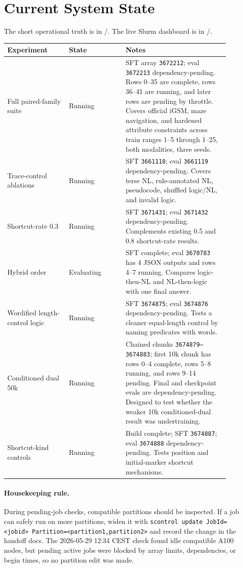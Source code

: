 \section{Current System State}

The short operational truth is in \repo{}/.
The live Slurm dashboard is in \repo{}/.

\begin{longtable}{p{0.25\linewidth}p{0.23\linewidth}p{0.42\linewidth}}
\toprule
Experiment & State & Notes \\
\midrule
Full paired-family suite & Running & SFT array \texttt{3672212}; eval \texttt{3672213} dependency-pending. Rows 0--35 are complete, rows 36--41 are running, and later rows are pending by throttle. Covers official iGSM, maze navigation, and hardened attribute constraints across train ranges 1--5 through 1--25, both modalities, three seeds. \\
Trace-control ablations & Running & SFT \texttt{3661118}; eval \texttt{3661119} dependency-pending. Covers terse NL, rule-annotated NL, pseudocode, shuffled logic/NL, and invalid logic. \\
Shortcut-rate 0.3 & Running & SFT \texttt{3671431}; eval \texttt{3671432} dependency-pending. Complements existing 0.5 and 0.8 shortcut-rate results. \\
Hybrid order & Evaluating & SFT complete; eval \texttt{3670783} has 4 JSON outputs and rows 4--7 running. Compares logic-then-NL and NL-then-logic with one final answer. \\
Wordified length-control logic & Running & SFT \texttt{3674875}; eval \texttt{3674876} dependency-pending. Tests a cleaner equal-length control by naming predicates with words. \\
Conditioned dual 50k & Running & Chained chunks \texttt{3674879--3674883}; first 10k chunk has rows 0--4 complete, rows 5--8 running, and rows 9--14 pending. Final and checkpoint evals are dependency-pending. Designed to test whether the weaker 10k conditioned-dual result was undertraining. \\
Shortcut-kind controls & Running & Build complete; SFT \texttt{3674887}; eval \texttt{3674888} dependency-pending. Tests position and initial-marker shortcut mechanisms. \\
\bottomrule
\end{longtable}

\paragraph{Housekeeping rule.}
During pending-job checks, compatible partitions should be inspected. If a job
can safely run on more partitions, widen it with
\texttt{scontrol update JobId=<jobid> Partition=<partition1,partition2>} and
record the change in the handoff docs. The 2026-05-29 12:34 CEST check found
idle compatible A100 nodes, but pending active jobs were blocked by array
limits, dependencies, or begin times, so no partition edit was made.
